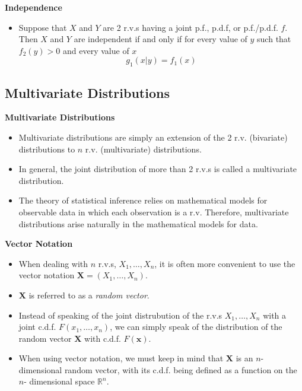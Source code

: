 \documentclass[11pt]{article}
\begin{document}
\textbf{Independence}
\begin{itemize}
    \item Suppose that $X$ and $Y$ are 2 r.v.s having a joint p.f., p.d.f, or p.f./p.d.f. $f$. 
    Then $X$ and $Y$ are independent if and only if for every value of $y$ such that $f_2(y)
    >0$ and every value of $x$
    \[g_1(x|y)=f_1(x)\]
\end{itemize}

\subsection{Multivariate Distributions}

\textbf{Multivariate Distributions}
\begin{itemize}
    \item Multivariate distributions are simply an extension of the 2 r.v. (bivariate)
    distributions to $n$ r.v. (multivariate) distributions.
    \item In general, the joint distribution of more than 2 r.v.s is called a multivariate 
    distribution.
    \item The theory of statistical inference relies on mathematical models for observable data
    in which each observation is a r.v. Therefore, multivariate distributions arise naturally 
    in the mathematical models for data. 
\end{itemize}

\textbf{Vector Notation}
\begin{itemize}
    \item When dealing with $n$ r.v.s, $X_1, \ldots, X_n$, it is often more convenient to use 
    the vector notation $\boldsymbol{X}=(X_1, \ldots, X_n)$.
    \item $\boldsymbol{X}$ is referred to as a \textit{random vector}.
    \item Instead of speaking of the joint distrubution of the r.v.s $X_1, \ldots, X_n$ with a
    joint c.d.f. $F(x_1, \ldots, x_n)$, we can simply speak of the distribution of the random 
    vector $\boldsymbol{X}$ with c.d.f. $F(\boldsymbol{x})$.
    \item When using vector notation, we must keep in mind that $\boldsymbol{X}$ is an $n$-
    dimensional random vector, with its c.d.f. being defined as a function on the $n$-
    dimensional space $\mathbb{R}^n$.
\end{itemize}
\end{document}
